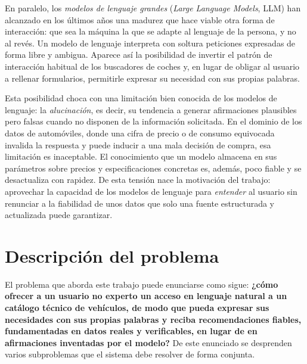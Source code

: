En paralelo, los \emph{modelos de lenguaje grandes} (\emph{Large Language
Models}, LLM) han alcanzado en los últimos años una madurez que hace viable otra
forma de interacción: que sea la máquina la que se adapte al lenguaje de la
persona, y no al revés. Un modelo de lenguaje interpreta con soltura peticiones
expresadas de forma libre y ambigua. Aparece así la posibilidad de invertir el
patrón de interacción habitual de los buscadores de coches y, en lugar de obligar
al usuario a rellenar formularios, permitirle expresar su necesidad con sus
propias palabras.

Esta posibilidad choca con una limitación bien conocida de los modelos de
lenguaje: la \emph{alucinación}, es decir, su tendencia a generar afirmaciones
plausibles pero falsas cuando no disponen de la información solicitada. En el
dominio de los datos de automóviles, donde una cifra de precio o de consumo
equivocada invalida la respuesta y puede inducir a una mala decisión de compra,
esa limitación es inaceptable. El conocimiento que un modelo almacena en sus
parámetros sobre precios y especificaciones concretas es, además, poco fiable y
se desactualiza con rapidez. De esta tensión nace la motivación del trabajo:
aprovechar la capacidad de los modelos de lenguaje para \emph{entender} al
usuario sin renunciar a la fiabilidad de unos datos que solo una fuente
estructurada y actualizada puede garantizar.

\section{Descripción del problema}
\label{sec:intro-problema}

El problema que aborda este trabajo puede enunciarse como sigue: \textbf{¿cómo
ofrecer a un usuario no experto un acceso en lenguaje natural a un catálogo
técnico de vehículos, de modo que pueda expresar sus necesidades con sus propias
palabras y reciba recomendaciones fiables, fundamentadas en datos reales y
verificables, en lugar de en afirmaciones inventadas por el modelo?} De este
enunciado se desprenden varios subproblemas que el sistema debe resolver de forma
conjunta.

